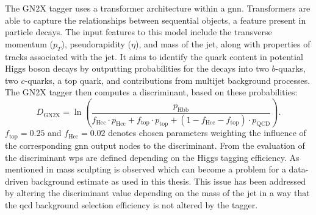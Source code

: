 The GN2X tagger uses a transformer architecture \citep{ATL-PHYS-PUB-2023-021} within a \ac{gnn}. Transformers are able to capture the relationships between sequential objects, a feature present in particle decays. The input features to this model include the transverse momentum ($p_T$), pseudorapidity ($\eta$), and mass of the jet, along with properties of tracks associated with the jet. It aims to identify the quark content in potential Higgs boson decays by outputting probabilities for the decays into two $b$-quarks, two $c$-quarks, a top quark, and contributions from multijet background processes. The GN2X tagger then computes a discriminant, based on these probabilities:
\begin{equation}
  D_{\text{GN2X}}=\ln\left({\frac{p_{\text{Hbb}}}{
  f_{\text{Hcc}}\cdot p_{\text{Hcc}}+
  f_{\text{top}}\cdot p_{\text{top}}+
  (1-f_{\text{Hcc}}-f_{\text{top}})\cdot p_{\text{QCD}}}}\right).
\end{equation}
$f_\text{top}=0.25$ and $f_\text{Hcc}=0.02$ denotes chosen parameters weighting the influence of the corresponding \ac{gnn} output nodes to the discriminant. From the evaluation of the discriminant \acp{wp} are defined depending on the Higgs tagging efficiency. As mentioned in \citep{ATL-PHYS-PUB-2023-021} mass sculpting is observed which can become a problem for a data-driven background estimate as used in this thesis. This issue has been addressed by altering the discriminant value depending on the mass of the jet in a way that the \ac{qcd} background selection efficiency is not altered by the tagger.


